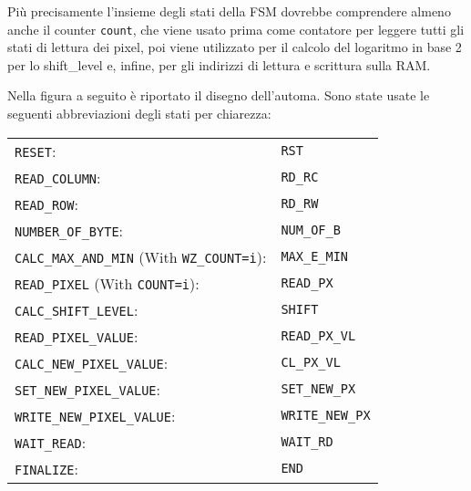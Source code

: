 \documentclass{article}
\begin{document}
Più precisamente l'insieme degli stati della FSM dovrebbe comprendere almeno anche il counter \texttt{count}, che viene usato prima come contatore per leggere tutti gli stati di lettura dei pixel, poi viene utilizzato per il calcolo del logaritmo in base 2 per lo shift\_level e, infine, per gli indirizzi di lettura e scrittura sulla RAM.


Nella figura a seguito è riportato il disegno dell'automa. Sono state usate le seguenti abbreviazioni degli stati per chiarezza:\\

\begin{center}
\begin{tabular}{ll}
\texttt{RESET}: & \texttt{RST}\\
\texttt{READ\_COLUMN}: & \texttt{RD\_RC} \\
\texttt{READ\_ROW}: & \texttt{RD\_RW} \\
\texttt{NUMBER\_OF\_BYTE}: & \texttt{NUM\_OF\_B} \\
\texttt{CALC\_MAX\_AND\_MIN} (With \texttt{WZ\_COUNT=i}): & \texttt{MAX\_E\_MIN} \\
\texttt{READ\_PIXEL} (With \texttt{COUNT=i}): & \texttt{READ\_PX} \\
\texttt{CALC\_SHIFT\_LEVEL}: & \texttt{SHIFT} \\
\texttt{READ\_PIXEL\_VALUE}: & \texttt{READ\_PX\_VL} \\
\texttt{CALC\_NEW\_PIXEL\_VALUE}: & \texttt{CL\_PX\_VL} \\
\texttt{SET\_NEW\_PIXEL\_VALUE}: & \texttt{SET\_NEW\_PX} \\
\texttt{WRITE\_NEW\_PIXEL\_VALUE}: & \texttt{WRITE\_NEW\_PX} \\
\texttt{WAIT\_READ}: & \texttt{WAIT\_RD} \\
\texttt{FINALIZE}: & \texttt{END} \\
\end{tabular}
\end{center}
\end{document}
